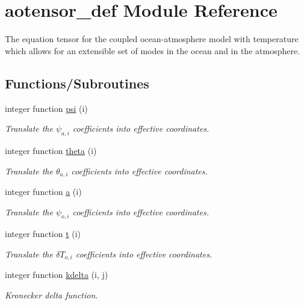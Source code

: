 \hypertarget{namespaceaotensor__def}{}\section{aotensor\+\_\+def Module Reference}
\label{namespaceaotensor__def}


The equation tensor for the coupled ocean-\/atmosphere model with temperature which allows for an extensible set of modes in the ocean and in the atmosphere.  


\subsection*{Functions/\+Subroutines}
\begin{DoxyCompactItemize}
\item 
integer function \hyperlink{namespaceaotensor__def_afa05aa849a8cb9e08b36dee6560986b8}{psi} (i)
\begin{DoxyCompactList}\small\item\em Translate the $\psi_{a,i}$ coefficients into effective coordinates. \end{DoxyCompactList}\item 
integer function \hyperlink{namespaceaotensor__def_a506f7d7bc9671005e5ed9a403bb29394}{theta} (i)
\begin{DoxyCompactList}\small\item\em Translate the $\theta_{a,i}$ coefficients into effective coordinates. \end{DoxyCompactList}\item 
integer function \hyperlink{namespaceaotensor__def_abdb4d710d4614fef61179c46d8e26b8e}{a} (i)
\begin{DoxyCompactList}\small\item\em Translate the $\psi_{o,i}$ coefficients into effective coordinates. \end{DoxyCompactList}\item 
integer function \hyperlink{namespaceaotensor__def_aed72341f9a3de19b5e8c21fd27471ce6}{t} (i)
\begin{DoxyCompactList}\small\item\em Translate the $\delta T_{o,i}$ coefficients into effective coordinates. \end{DoxyCompactList}\item 
integer function \hyperlink{namespaceaotensor__def_a13eb91ac3a121fd77c1cf644021cff5b}{kdelta} (i, j)
\begin{DoxyCompactList}\small\item\em Kronecker delta function. \end{DoxyCompactList}\item 

\end{DoxyCompactItemize}
